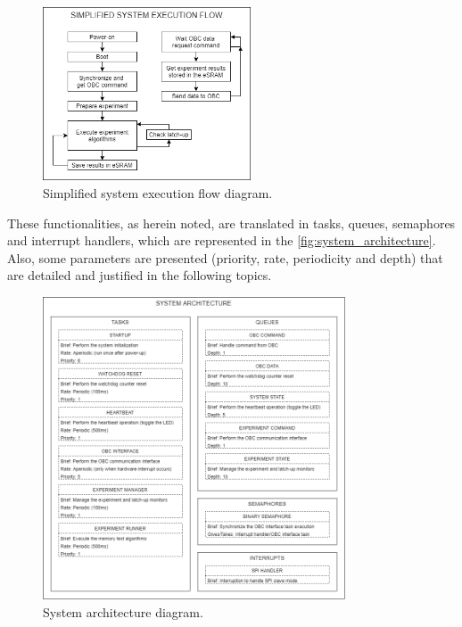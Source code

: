 \begin{figure}[!ht]
    \begin{center}
        \includegraphics[width=0.55\textwidth]{figures/system_flow.png}
        \caption{Simplified system execution flow diagram.}
        \label{fig:system_flow}
    \end{center}
\end{figure}

These functionalities, as herein noted, are translated in tasks, queues, semaphores and interrupt handlers, which are represented in the \autoref{fig:system_architecture}. Also, some parameters are presented (priority, rate, periodicity and depth) that are detailed and justified in the following topics.

\begin{figure}[!ht]
    \begin{center}
        \includegraphics[width=0.8\textwidth]{figures/system_architecture.png}
        \caption{System architecture diagram.}
        \label{fig:system_architecture}
    \end{center}
\end{figure}

